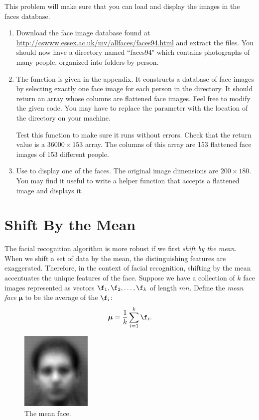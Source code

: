 \begin{problem}
\label{prob:getTrainingFaces}
This problem will make sure that you can load and display the images in the faces database.
\begin{enumerate}
\item Download the  face image database found at \url{http://cswww.essex.ac.uk/mv/allfaces/faces94.html} and extract the files.
You should now have a directory named ``faces94" which contains photographs of many people, organized into folders by person.

\item The function  is given in the appendix. %
It constructs a database of face images by selecting exactly one face image for each person in the directory.
It should return an array whose columns are flattened face images.
Feel free to modify the given code.
You may have to replace the parameter  with the location of the directory  on your machine.

Test this function to make sure it runs without errors.
Check that the return value  is a $36000 \times 153$ array. 
The columns of this array are 153 flattened face images of 153 different people.

\item Use  to display one of the faces.
The original image dimensions are $200 \times 180$.
You may find it useful to write a helper function that accepts a flattened image and displays it.

\end{enumerate}
\end{problem}


\section*{Shift By the Mean}

The facial recognition algorithm is more robust if we first \emph{shift by the mean}. When we shift a set of data by the mean, the distinguishing features are exaggerated. Therefore, in the context of facial recognition, shifting by the mean accentuates the unique features of the face.
Suppose we have a collection of $k$ face images represented as vectors $\f_1, \f_2, \ldots, \f_k$ of length $mn$.
Define the \emph{mean face} ${\boldsymbol \mu}$ to be the average of the $\f_i$:
\[
{\boldsymbol \mu} = \frac{1}{k}\sum_{i=1}^k \f_i.
\]
\begin{figure}
\includegraphics[width=0.3\textwidth]{meanFace.png}
\caption{The mean face.}
\label{facialRecognition:meanFace}
\end{figure}

